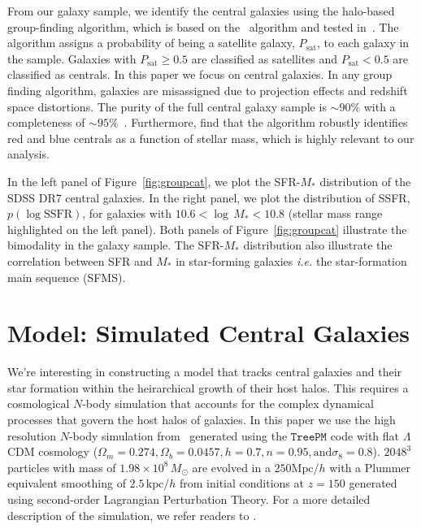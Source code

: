 \documentclass[12pt, letterpaper, preprint]{aastex}
\begin{document}
From our galaxy sample, we identify the central galaxies using the \cite{tinker2011} halo-based 
group-finding algorithm, which is based on the~\cite{yang2005} algorithm and tested 
in~\cite{campbell2015}. The algorithm assigns a probability of being a satellite 
galaxy, $P_\mathrm{sat}$, to each galaxy in the sample. Galaxies with $P_\mathrm{sat} \geq 0.5$ 
are classified as satellites and $P_\mathrm{sat} < 0.5$ are classified as centrals. 
In this paper we focus on central galaxies. In any group finding algorithm, galaxies are 
misassigned due to projection effects and redshift space distortions. The purity 
of the full central galaxy sample is $\sim 90\%$ with a completeness of $\sim 95\%$~\citep{tinker2017}.
Furthermore, \cite{campbell2015} find that the algorithm robustly identifies red and blue centrals
as a function of stellar mass, which is highly relevant to our analysis.  

In the left panel of Figure~\ref{fig:groupcat}, we plot the SFR-$M_*$ distribution of
the SDSS DR7 central galaxies. In the right panel, we plot the distribution of SSFR, 
$p(\log \mathrm{SSFR})$, for galaxies with $10.6 < \log \,M_* < 10.8$ (stellar mass range 
highlighted on the left panel). Both panels of Figure~\ref{fig:groupcat} illustrate the 
bimodality in the galaxy sample. The SFR-$M_*$ distribution also illustrate the correlation
between SFR and $M_*$ in star-forming galaxies \emph{i.e.} the star-formation main sequence 
(SFMS).

\section{Model: Simulated Central Galaxies} \label{sec:sim}
We're interesting in constructing a model that tracks central galaxies and their star 
formation within the heirarchical growth of their host halos. This requires a cosmological 
$N$-body simulation that accounts for the complex dynamical processes that govern the host 
halos of galaxies. In this paper we use the high resolution $N$-body simulation 
from~\cite{wetzel2013} generated using the \cite{white2002} $\mathtt{TreePM}$ code 
with flat $\Lambda$CDM cosmology 
($\Omega_m =0.274, \Omega_b = 0.0457, h = 0.7, n=0.95, \mathrm{and} \sigma_8 = 0.8$).
$2048^3$ particles with mass of $1.98 \times 10^8\,M_\odot$ are evolved in a $250 \mathrm{Mpc}/h$
with a Plummer equivalent smoothing of $2.5\,\mathrm{kpc}/h$ from initial conditions at $z = 150$ 
generated using second-order Lagrangian Perturbation Theory. For a more detailed description of 
the simulation, we refer readers to \cite{wetzel2013, wetzel2014}.
\end{document}
